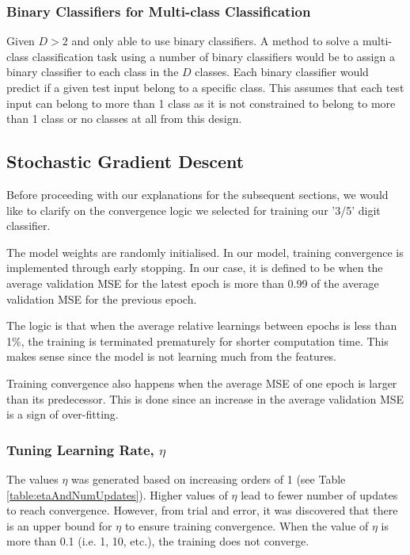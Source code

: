 \documentclass[a4paper,12pt]{article}
\begin{document}
\subsubsection{Binary Classifiers for Multi-class Classification}

Given $D > 2$ and only able to use binary classifiers. A method to solve a multi-class classification task using a number of binary classifiers would be to assign a binary classifier to each class in the $D$ classes. 
Each binary classifier would predict if a given test input belong to a specific class. This assumes that each test input can belong to more than 1 class as it is not constrained to belong to more than 1 class or no classes at all from this design. 

\clearpage
\subsection{Stochastic Gradient Descent}
Before proceeding with our explanations for the subsequent sections, we would like to clarify on the convergence logic we selected for training our '3/5' digit classifier.

The model weights are randomly initialised. In our model, training convergence is implemented through early stopping. In our case, it is defined to be when the average validation MSE for the latest epoch is more than 0.99 of the average validation MSE for the previous epoch.

The logic is that when the average relative learnings between epochs is less than 1\%, the training is terminated prematurely for shorter computation time. This makes sense since the model is not learning much from the features. 

Training convergence also happens when the average MSE of one epoch is larger than its predecessor. This is done since an increase in the average validation MSE is a sign of over-fitting.

\subsubsection{Tuning Learning Rate, $\eta$}

The values $\eta$ was generated based on increasing orders of 1 (see Table \ref{table:etaAndNumUpdates}). Higher values of $\eta$ lead to fewer number of updates to reach convergence. However, from trial and error, it was discovered that there is an upper bound for $\eta$ to ensure training convergence. When the value of $\eta$ is more than 0.1 (i.e. 1, 10, etc.), the training does not converge.
\end{document}
